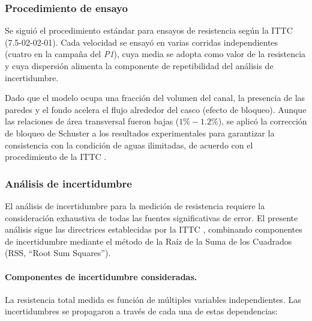 \subsubsection{Procedimiento de ensayo}

Se siguió el procedimiento estándar para ensayos de resistencia según la ITTC (7.5-02-02-01). Cada velocidad se ensayó en varias corridas independientes (cuatro en la campaña del \textit{P1}), cuya media se adopta como valor de la resistencia y cuya dispersión alimenta la componente de repetibilidad del análisis de incertidumbre.

Dado que el modelo ocupa una fracción del volumen del canal, la presencia de las paredes y el fondo acelera el flujo alrededor del casco (efecto de bloqueo). Aunque las relaciones de área transversal fueron bajas ($1\% - 1.2\%$), se aplicó la corrección de bloqueo de Schuster a los resultados experimentales para garantizar la consistencia con la condición de aguas ilimitadas, de acuerdo con el procedimiento de la ITTC \cite{ITTC_resistance}.

\subsubsection{Análisis de incertidumbre}
\label{sec:analisis_incertidumbre_general}

El análisis de incertidumbre para la medición de resistencia requiere la consideración exhaustiva de todas las fuentes significativas de error. El presente análisis sigue las directrices establecidas por la ITTC \cite{ITTC_uncertainty}, combinando componentes de incertidumbre mediante el método de la Raíz de la Suma de los Cuadrados (RSS, ``Root Sum Squares'').

\paragraph{Componentes de incertidumbre consideradas.}

La resistencia total medida es función de múltiples variables independientes. Las incertidumbres se propagaron a través de cada una de estas dependencias:

